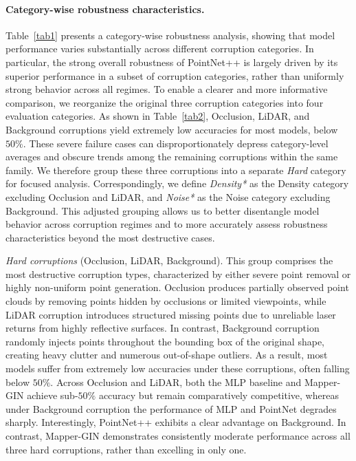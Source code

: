 \documentclass{article}
\begin{document}
\paragraph{Category-wise robustness characteristics.}
Table~\ref{tab1} presents a category-wise robustness analysis, showing that model performance varies substantially across different corruption categories. In particular, the strong overall robustness of PointNet++ is largely driven by its superior performance in a subset of corruption categories, rather than uniformly strong behavior across all regimes.
To enable a clearer and more informative comparison, we reorganize the original three corruption categories into four evaluation categories. As shown in Table~\ref{tab2}, Occlusion, LiDAR, and Background corruptions yield extremely low accuracies for most models, below $50\%$. These severe failure cases can disproportionately depress category-level averages and obscure trends among the remaining corruptions within the same family. 
We therefore group these three corruptions into a separate \emph{Hard} category for focused analysis. Correspondingly, we define \emph{Density*} as the Density category excluding Occlusion and LiDAR, and \emph{Noise*} as the Noise category excluding Background. This adjusted grouping allows us to better disentangle model behavior across corruption regimes and to more accurately assess robustness characteristics beyond the most destructive cases.

\vspace{3mm}
\emph{Hard corruptions} (Occlusion, LiDAR, Background).
This group comprises the most destructive corruption types, characterized by either severe point removal or highly non-uniform point generation. Occlusion produces partially observed point clouds by removing points hidden by occlusions or limited viewpoints, while LiDAR corruption introduces structured missing points due to unreliable laser returns from highly reflective surfaces. In contrast, Background corruption randomly injects points throughout the bounding box of the original shape, creating heavy clutter and numerous out-of-shape outliers. As a result, most models suffer from extremely low accuracies under these corruptions, often falling below $50\%$.
Across Occlusion and LiDAR, both the MLP baseline and Mapper-GIN achieve sub-$50\%$ accuracy but remain comparatively competitive, whereas under Background corruption the performance of MLP and PointNet degrades sharply. Interestingly, PointNet++ exhibits a clear advantage on Background. In contrast, Mapper-GIN demonstrates consistently moderate performance across all three hard corruptions, rather than excelling in only one.
\end{document}
